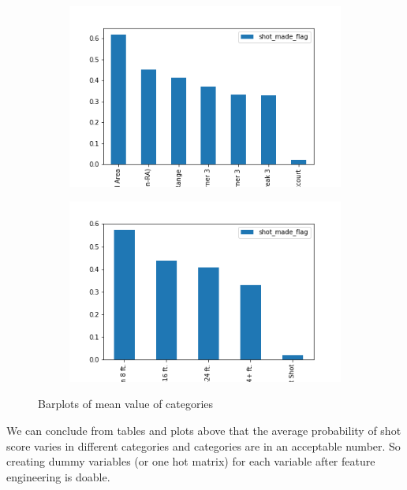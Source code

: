 \documentclass[a4paper,11pt,onecolumn,twoside]{article}
\begin{document}
\begin{figure}[htbp]
\begin{subfigure}[t]{0.30\textwidth}
	\end{subfigure}	
	\\
	\begin{subfigure}[t]{0.30\textwidth}
		\centering
		\includegraphics[width=1.0\textwidth]{shot_zone_basic.png}
	\end{subfigure}	
	\quad
	\begin{subfigure}[t]{0.30\textwidth}
		\centering
		\includegraphics[width=1.0\textwidth]{shot_zone_range.png}
	\end{subfigure}	
	\quad
	\begin{subfigure}[t]{0.30\textwidth}
		\centering
		\subcaption*{}
	\end{subfigure}
	\caption{Barplots of mean value of categories}
\end{figure}
We can conclude from tables and plots above that the average probability of shot score varies in different categories and categories are in an acceptable number. So creating dummy variables (or one hot matrix) for each variable after feature engineering is doable.\par
\end{document}

